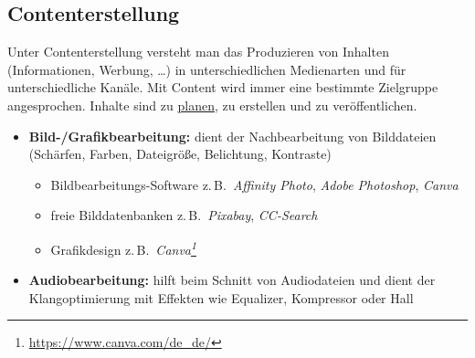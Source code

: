 \documentclass[
  11pt,
  letterpaper,
  DIV=11,
  twoside]{scrreprt}
\providecommand{\tightlist}{%
  \setlength{\itemsep}{0pt}\setlength{\parskip}{0pt}}\usepackage{longtable,booktabs,array}
\DeclareRobustCommand{\href}[2]{#2\footnote{\url{#1}}}
\begin{document}
\subsection{Contenterstellung}\label{contenterstellung}

Unter Contenterstellung versteht man das Produzieren von Inhalten
(Informationen, Werbung, \ldots) in unterschiedlichen Medienarten und
für unterschiedliche Kanäle. Mit Content wird immer eine bestimmte
Zielgruppe angesprochen. Inhalte sind zu \hyperref[redaktion]{planen},
zu erstellen und zu veröffentlichen.

\begin{itemize}
\item
  \textbf{Bild-/Grafikbearbeitung:} dient der Nachbearbeitung von
  Bilddateien (Schärfen, Farben, Dateigröße, Belichtung, Kontraste)

  \begin{itemize}
  \tightlist
  \item
    Bildbearbeitungs-Software z.\,B.~\emph{Affinity Photo}, \emph{Adobe
    Photoshop}, \emph{Canva}
  \item
    freie Bilddatenbanken z.\,B.~\emph{Pixabay}, \emph{CC-Search}
  \item
    Grafikdesign
    z.\,B.~\emph{\href{https://www.canva.com/de_de/}{Canva}}
  \end{itemize}
\item
  \textbf{Audiobearbeitung:} hilft beim Schnitt von Audiodateien und
  dient der Klangoptimierung mit Effekten wie Equalizer, Kompressor oder
  Hall


\end{itemize}
\end{document}
